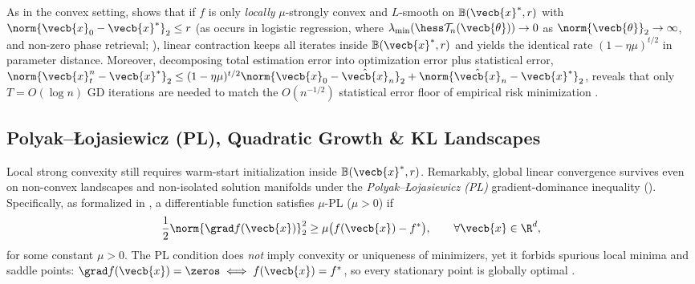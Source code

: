 \documentclass[../../../../master.tex]{subfiles}
\begin{document}
As in the convex setting,  shows that if $f$ is only \emph{locally} $\mu$-strongly convex and $L$-smooth on $\mathbb{B}(\vecb{x}^*, r)$ with $\norm{\vecb{x}_0 - \vecb{x}^*}_2 \le r$ (as occurs in logistic regression, where $\lambda_{\min}(\hess \mathcal{T}_n(\vecb{\theta})) \to 0$ as $\norm{\vecb{\theta}}_2 \to \infty$, and non-zero phase retrieval; ), linear contraction keeps all iterates inside $\mathbb{B}(\vecb{x}^*, r)$ and yields the identical rate $(1-\eta\mu)^{t/2}$ in parameter distance. Moreover, decomposing total estimation error into optimization error plus statistical error, $\norm{\vecb{x}_t^n - \vecb{x}^*}_2 \le (1-\eta\mu)^{t/2}\norm{\vecb{x}_0 - \hat{\vecb{x}}_n}_2 + \norm{\hat{\vecb{x}}_n - \vecb{x}^*}_2$, reveals that only $T = O(\log n)$ GD iterations are needed to match the $O(n^{-1/2})$ statistical error floor of empirical risk minimization .

\subsection{Polyak--\L{}ojasiewicz (PL), Quadratic Growth \& KL Landscapes}
\label{subsec:gdconv:pl}

Local strong convexity still requires warm-start initialization inside $\mathbb{B}(\vecb{x}^*, r)$. Remarkably, global linear convergence survives even on non-convex landscapes and non-isolated solution manifolds under the \emph{Polyak--\L{}ojasiewicz (PL)} gradient-dominance inequality (). Specifically, as formalized in , a differentiable function satisfies $\mu$-PL ($\mu > 0$) if
\begin{equation}
\label{eq:gdconv:pl_def}
  \frac{1}{2}\norm{\grad f(\vecb{x})}_2^2 \ge \mu \big(f(\vecb{x}) - f^*\big), \qquad \forall \vecb{x} \in \R^d,
\end{equation}
for some constant $\mu > 0$. The PL condition does \emph{not} imply convexity or uniqueness of minimizers, yet it forbids spurious local minima and saddle points: $\grad f(\vecb{x}) = \zeros \iff f(\vecb{x}) = f^*$, so every stationary point is globally optimal  .
\end{document}
